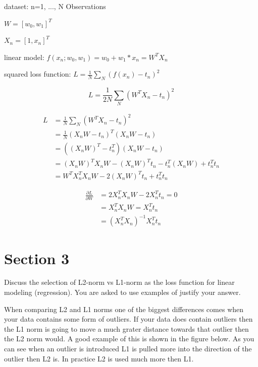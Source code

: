 \documentclass{report}
\begin{document}
\vspace{5mm}

dataset: n=1, ..., N Observations

$W = [w_0, w_1]^T$

$X_n = [1, x_n]^T$

linear model: $f(x_n; w_0, w_1) = w_0+w_1*x_n = W^TX_n$

squared loss function: $L = \frac{1}{N} \sum_{N} (f(x_n) - t_n)^2$

$$L = \frac{1}{2N} \sum_{N} (W^TX_n - t_n)^2$$

\begin{equation} \label{eq1}
\begin{split}
L & = \frac{1}{N} \sum_{N} (W^TX_n - t_n)^2\\
  & = \frac{1}{N} (X_nW - t_n)^T(X_nW-t_n) \\
  & = ((X_nW)^T - t_n^T)(X_nW-t_n) \\
  & = (X_nW)^T X_nW - (X_nW)^Tt_n - t_n^T(X_nW) + t_n^Tt_n \\
  & = W^TX_n^TX_nW - 2(X_nW)^Tt_n + t_n^Tt_n
\end{split}
\end{equation}

\begin{equation} \label{eq2}
\begin{split}
\frac{\partial L}{\partial W}  & = 2X_n^TX_nW - 2X_n^Tt_n = 0 \\
                               & = X_n^TX_nW = X_n^Tt_n \\
                               & = (X_n^TX_n)^{-1}X_n^Tt_n
\end{split}
\end{equation}

\chapter{Section 3}
Discuss the selection of L2-norm vs L1-norm as the loss function for linear modeling (regression). You are asked to use examples of justify your answer.

When comparing L2 and L1 norms one of the biggest differences comes when your data contains some form of outliers. If your data does contain outliers then the L1 norm is going to move a much grater distance towards that outlier then the L2 norm would. A good example of this is shown in the figure below. As you can see when an outlier is introduced L1 is pulled more into the direction of the outlier then L2 is. In practice L2 is used much more then L1.
\end{document}
